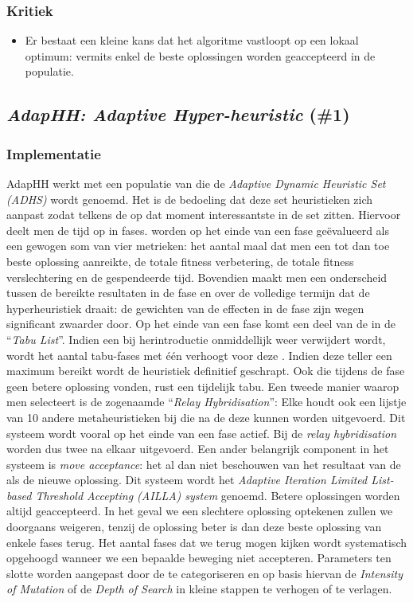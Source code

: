 \subsubsection{Kritiek}
\begin{itemize}
 \item Er bestaat een kleine kans dat het algoritme vastloopt op een lokaal optimum: vermits enkel de beste oplossingen worden geaccepteerd in de populatie.
\end{itemize}
\subsection{\emph{AdapHH: Adaptive Hyper-heuristic} (\#1)}
\label{sss:adaphh}
\subsubsection{Implementatie}
AdapHH\cite{chesc-adaphh,chesc-adaphh2,348072} werkt met een populatie van \abhn{} die de \emph{Adaptive Dynamic Heuristic Set (ADHS)} wordt genoemd. Het is de bedoeling dat deze set heuristieken zich aanpast zodat telkens de op dat moment interessantste \abhn{} in de set zitten. Hiervoor deelt men de tijd op in fases. \abh[H]{} worden op het einde van een fase ge\"evalueerd als een gewogen som van vier metrieken: het aantal maal dat men een tot dan toe beste oplossing aanreikte, de totale fitness verbetering, de totale fitness verslechtering en de gespendeerde tijd. Bovendien maakt men een onderscheid tussen de bereikte resultaten in de fase en over de volledige termijn dat de hyperheuristiek draait: de gewichten van de effecten in de fase zijn wegen significant zwaarder door. Op het einde van een fase komt een deel van de \abhn{} in de ``\emph{Tabu List}''\cite{DBLP:journals/informs/Glover89}. Indien een \abh{} bij herintroductie onmiddellijk weer verwijdert wordt, wordt het aantal tabu-fases met \'e\'en verhoogt voor deze \abh{}. Indien deze teller een maximum bereikt wordt de heuristiek definitief geschrapt. Ook \abhn{} die tijdens de fase geen betere oplossing vonden, rust een tijdelijk tabu. Een tweede manier waarop men \abhn{} selecteert is de zogenaamde ``\emph{Relay Hybridisation}'': Elke \abhn{} houdt ook een lijstje van 10 andere metaheuristieken bij die na de deze \abh{} kunnen worden uitgevoerd. Dit systeem wordt vooral op het einde van een fase actief. Bij de \emph{relay hybridisation} worden dus twee \abhn{} na elkaar uitgevoerd. Een ander belangrijk component in het systeem is \emph{move acceptance}: het al dan niet beschouwen van het resultaat van de \abh{} als de nieuwe oplossing. Dit systeem wordt het \emph{Adaptive Iteration Limited List-based Threshold Accepting (AILLA) system} genoemd. Betere oplossingen worden altijd geaccepteerd. In het geval we een slechtere oplossing optekenen zullen we doorgaans weigeren, tenzij de oplossing beter is dan deze beste oplossing van enkele fases terug. Het aantal fases dat we terug mogen kijken wordt systematisch opgehoogd wanneer we een bepaalde beweging niet accepteren. Parameters ten slotte worden aangepast door de \abhn{} te categoriseren en op basis hiervan de \emph{Intensity of Mutation} of de \emph{Depth of Search} in kleine stappen te verhogen of te verlagen.

